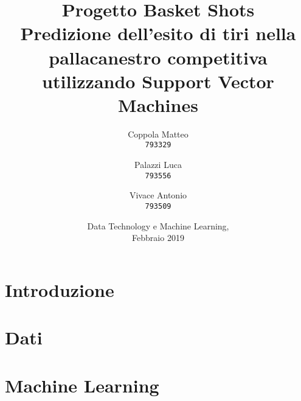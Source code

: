 \documentclass[12pt,a4paper]{report}
\begin{document}
\title{%
  \Huge Progetto Basket Shots\\
  \large Predizione dell'esito di tiri nella pallacanestro competitiva utilizzando Support Vector Machines\\
    }
\author{
  Coppola Matteo\\
  \texttt{793329}
  \and
  Palazzi Luca\\
  \texttt{793556}
   \and
  Vivace Antonio\\
  \texttt{793509}
}
\date{Data Technology e Machine Learning, \\ Febbraio 2019}
\maketitle

\tableofcontents

\chapter{Introduzione}

\chapter{Dati}




\chapter{Machine Learning}





\end{document}

